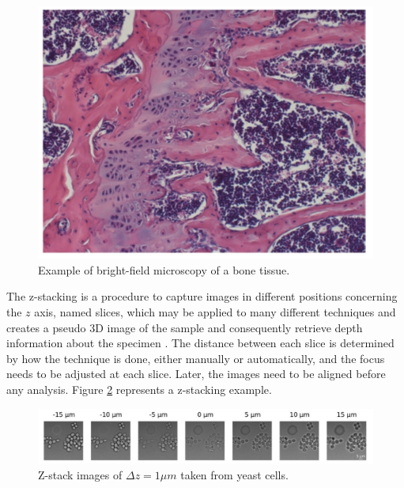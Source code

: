 \begin{figure}[htb]
	\centering
	\caption{\label{fig:bright-field_microscopy} Example of bright-field microscopy of a bone tissue.}
	\begin{center}
	    \includegraphics[scale=0.22]{images/bright-field_microscopy.png}
	\end{center}
	\centering
\end{figure}

The z-stacking is a procedure to capture images in different positions concerning the $z$ axis, named slices, which may be applied to many different techniques and creates a pseudo 3D image of the sample and consequently retrieve depth information about the specimen \cite{lawlor2019introduction}. The distance between each slice is determined by how the technique is done, either manually or automatically, and the focus needs to be adjusted at each slice. Later, the images need to be aligned before any analysis. Figure \ref{fig:z-stack_example} represents a z-stacking example.

\begin{figure}[htb]
	\centering
	\caption{\label{fig:z-stack_example} Z-stack images of $\Delta z = 1 \mu m$ taken from yeast cells.}
	\begin{center}
	    \includegraphics[scale=0.3]{images/z-stack.png}
	\end{center}
	\centering
\end{figure}